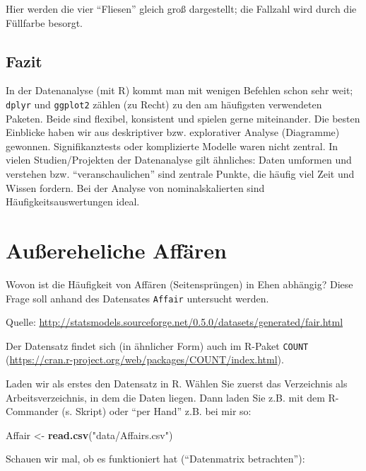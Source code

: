 \documentclass[12pt,ngerman,]{book}
\makeatletter
\newenvironment{Shaded}{\begin{snugshade}}{\end{snugshade}}
\newcommand{\KeywordTok}[1]{\textcolor[rgb]{0.13,0.29,0.53}{\textbf{{#1}}}}
\newcommand{\StringTok}[1]{\textcolor[rgb]{0.31,0.60,0.02}{{#1}}}
\newcommand{\NormalTok}[1]{{#1}}
\newenvironment{kframe}{%
\medskip{}
\setlength{\fboxsep}{.8em}
 \def\at@end@of@kframe{}%
 \ifinner\ifhmode%
  \def\at@end@of@kframe{\end{minipage}}%
  \begin{minipage}{\columnwidth}%
 \fi\fi%
 \def\FrameCommand##1{\hskip\@totalleftmargin \hskip-\fboxsep
 \colorbox{shadecolor}{##1}\hskip-\fboxsep
     \hskip-\linewidth \hskip-\@totalleftmargin \hskip\columnwidth}%
 \MakeFramed {\advance\hsize-\width
   \@totalleftmargin\z@ \linewidth\hsize
   \@setminipage}}%
 {\par\unskip\endMakeFramed%
 \at@end@of@kframe}
\renewenvironment{Shaded}{\begin{kframe}}{\end{kframe}}
\makeatother
\begin{document}
Hier werden die vier ``Fliesen'' gleich groß dargestellt; die Fallzahl
wird durch die Füllfarbe besorgt.

\subsection{Fazit}\label{fazit-1}

In der Datenanalyse (mit R) kommt man mit wenigen Befehlen schon sehr
weit; \texttt{dplyr} und \texttt{ggplot2} zählen (zu Recht) zu den am
häufigsten verwendeten Paketen. Beide sind flexibel, konsistent und
spielen gerne miteinander. Die besten Einblicke haben wir aus
deskriptiver bzw. explorativer Analyse (Diagramme) gewonnen.
Signifikanztests oder komplizierte Modelle waren nicht zentral. In
vielen Studien/Projekten der Datenanalyse gilt ähnliches: Daten umformen
und verstehen bzw. ``veranschaulichen'' sind zentrale Punkte, die häufig
viel Zeit und Wissen fordern. Bei der Analyse von nominalskalierten sind
Häufigkeitsauswertungen ideal.

\section{Außereheliche Affären}\label{auereheliche-affaren}

Wovon ist die Häufigkeit von Affären (Seitensprüngen) in Ehen abhängig?
Diese Frage soll anhand des Datensates \texttt{Affair} untersucht
werden.

Quelle:
\url{http://statsmodels.sourceforge.net/0.5.0/datasets/generated/fair.html}

Der Datensatz findet sich (in ähnlicher Form) auch im R-Paket
\texttt{COUNT}
(\url{https://cran.r-project.org/web/packages/COUNT/index.html}).

Laden wir als erstes den Datensatz in R. Wählen Sie zuerst das
Verzeichnis als Arbeitsverzeichnis, in dem die Daten liegen. Dann laden
Sie z.B. mit dem R-Commander (s. Skript) oder ``per Hand'' z.B. bei mir
so:

\begin{Shaded}
\begin{Highlighting}[]
\NormalTok{Affair <-}\StringTok{ }\KeywordTok{read.csv}\NormalTok{(}\StringTok{"data/Affairs.csv"}\NormalTok{)}
\end{Highlighting}
\end{Shaded}

Schauen wir mal, ob es funktioniert hat (``Datenmatrix betrachten''):
\end{document}
